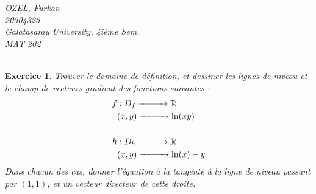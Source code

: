 \documentclass[10pt]{article}
\theoremstyle{frenchstyle}
\newtheorem{exercice}{Exercice}
\newcommand{\R}{\mathbb{R}}
\begin{document}
\begin{titlepage}
	\vspace*{\fill}
	\begin{minipage}[b]{.4\textwidth}
		\raggedright
		\scriptsize
		\textit{OZEL, Furkan}\\
		\textit{20504325}\\
		\textit{Galatasaray University, 4iéme Sem.}\\
		\textit{MAT 202}\\
		\
	\end{minipage}
\end{titlepage}

\tableofcontents
\newpage

\begin{exercice}
	Trouver le domaine de définition, et dessiner les lignes de niveau et le champ de vecteurs gradient des fonctions suivantes :
	\begin{align*}
		f & : D_f \xrightarrow{\hspace*{1cm}} \R    \\
		  & (x, y) \xmapsto{\hspace*{1cm}} \ln(xy)
		\\
		\\
		h & : D_h \xrightarrow{\hspace*{1cm}} \R    \\
		  & (x, y) \xmapsto{\hspace*{1cm}} \ln(x)-y
	\end{align*}
	Dans chacun des cas, donner l’équation à la tangente à la ligne de niveau passant par $(1, 1)$, et un vecteur directeur de cette droite.
\end{exercice}
\end{document}
